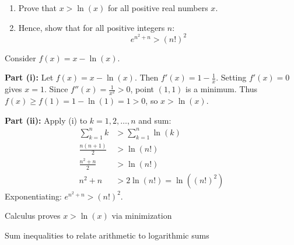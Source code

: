 \begin{problem}
\begin{enumerate}
\item[(i)] Prove that $x > \ln(x)$ for all positive real numbers $x$.
\item[(ii)] Hence, show that for all positive integers $n$:
\[ e^{n^2+n} > (n!)^2 \]
\end{enumerate}
\end{problem}

\begin{hint}
Consider $f(x) = x - \ln(x)$.
\end{hint}

\begin{solution}
\textbf{Part (i):} Let $f(x) = x - \ln(x)$. Then $f'(x) = 1 - \frac{1}{x}$.
Setting $f'(x) = 0$ gives $x = 1$. Since $f''(x) = \frac{1}{x^2} > 0$, point $(1,1)$ is a minimum.
Thus $f(x) \ge f(1) = 1 - \ln(1) = 1 > 0$, so $x > \ln(x)$.

\textbf{Part (ii):} Apply (i) to $k = 1, 2, \ldots, n$ and sum:
\begin{align*}
\sum_{k=1}^{n} k &> \sum_{k=1}^{n} \ln(k)\\
\frac{n(n+1)}{2} &> \ln(n!)\\
\frac{n^2 + n}{2} &> \ln(n!)\\
n^2 + n &> 2\ln(n!) = \ln((n!)^2)
\end{align*}
Exponentiating: $e^{n^2+n} > (n!)^2$.
\end{solution}

\begin{takeaways}
\item Calculus proves $x > \ln(x)$ via minimization
\item Sum inequalities to relate arithmetic to logarithmic sums
\end{takeaways}
